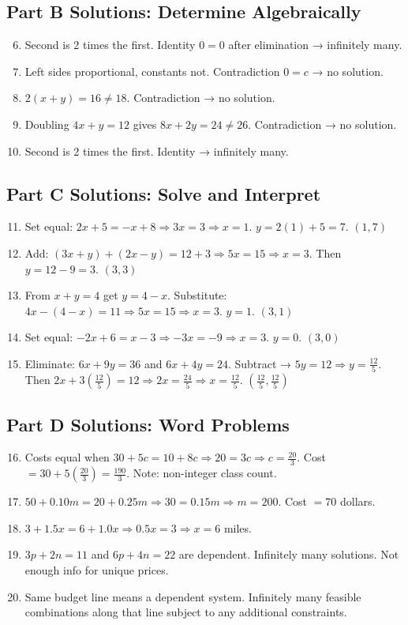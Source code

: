 \documentclass[14pt]{extarticle}
\begin{document}
\subsection*{Part B Solutions: Determine Algebraically}
\begin{enumerate}
  \setcounter{enumi}{5}
  \item Second is 2 times the first. Identity \(0=0\) after elimination → infinitely many.
  \item Left sides proportional, constants not. Contradiction \(0=c\) → no solution.
  \item \(2(x+y)=16 \neq 18\). Contradiction → no solution.
  \item Doubling \(4x+y=12\) gives \(8x+2y=24 \neq 26\). Contradiction → no solution.
  \item Second is 2 times the first. Identity → infinitely many.
\end{enumerate}

\subsection*{Part C Solutions: Solve and Interpret}
\begin{enumerate}
  \setcounter{enumi}{10}
  \item Set equal: \(2x+5=-x+8 \Rightarrow 3x=3 \Rightarrow x=1\). \(y=2(1)+5=7\). \(\boxed{(1,7)}\)
  \item Add: \((3x+y)+(2x-y)=12+3 \Rightarrow 5x=15 \Rightarrow x=3\). Then \(y=12-9=3\). \(\boxed{(3,3)}\)
  \item From \(x+y=4\) get \(y=4-x\). Substitute: \(4x-(4-x)=11 \Rightarrow 5x=15 \Rightarrow x=3\). \(y=1\). \(\boxed{(3,1)}\)
  \item Set equal: \(-2x+6=x-3 \Rightarrow -3x=-9 \Rightarrow x=3\). \(y=0\). \(\boxed{(3,0)}\)
  \item Eliminate: \(6x+9y=36\) and \(6x+4y=24\). Subtract → \(5y=12 \Rightarrow y=\tfrac{12}{5}\). Then \(2x+3(\tfrac{12}{5})=12 \Rightarrow 2x=\tfrac{24}{5} \Rightarrow x=\tfrac{12}{5}\). \(\boxed{(\tfrac{12}{5}, \tfrac{12}{5})}\)
\end{enumerate}

\subsection*{Part D Solutions: Word Problems}
\begin{enumerate}
  \setcounter{enumi}{15}
  \item Costs equal when \(30+5c=10+8c \Rightarrow 20=3c \Rightarrow c=\tfrac{20}{3}\). Cost \(=30+5(\tfrac{20}{3})=\tfrac{190}{3}\). Note: non-integer class count.
  \item \(50+0.10m=20+0.25m \Rightarrow 30=0.15m \Rightarrow m=200\). Cost \(=70\) dollars.
  \item \(3+1.5x=6+1.0x \Rightarrow 0.5x=3 \Rightarrow x=6\) miles.
  \item \(3p+2n=11\) and \(6p+4n=22\) are dependent. Infinitely many solutions. Not enough info for unique prices.
  \item Same budget line means a dependent system. Infinitely many feasible combinations along that line subject to any additional constraints.
\end{enumerate}
\end{document}
